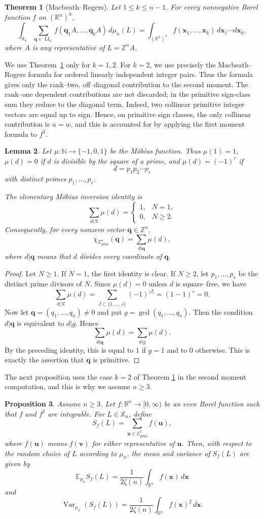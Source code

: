 \documentclass[a4paper,12pt]{article}
\newtheorem{thm}{Theorem}
\newtheorem{lem}[thm]{Lemma}
\newtheorem{prop}[thm]{Proposition}
\theoremstyle{definition}
\theoremstyle{remark}
\newcommand{\re}{\mathbb R}
\newcommand{\ze}{\mathbb Z}
\newcommand{\ex}{\mathbb E}
\newcommand{\LI}{\operatorname{LI}}
\newcommand{\prim}{\operatorname{prim}}
\newcommand{\Var}{\operatorname{Var}}
\begin{document}
\begin{thm}[Macbeath--Rogers]
\label{thm:macbeath}
Let $1\le k\le n-1$.
For every nonnegative Borel function $f$ on $(\re^n)^k$,
$$
\int_{\mathbb X_n}\sum_{\bm q\in\LI_k}f(\bm q_1A,\ldots,\bm q_kA)\,d\mu_n(L)
=
\int_{(\re^n)^k}f(\bm x_1,\ldots,\bm x_k)\,d\bm x_1\cdots d\bm x_k,
$$
where $A$ is any representative of $L=\ze^nA$.
\end{thm}
%
We use Theorem~\ref{thm:macbeath} only for $k=1,2$.
For $k=2$, we use precisely the Macbeath--Rogers formula for ordered
linearly independent integer pairs.
Thus the formula gives only the rank--two, off--diagonal contribution to the second moment.
The rank--one dependent contributions are not discarded; in the
primitive sign-class sum they reduce to the diagonal term.
Indeed, two collinear primitive integer vectors are equal up to sign.
Hence, on primitive sign classes, the only collinear contribution is
$u=w$, and this is accounted for by applying the first moment formula to $f^2$.
%
\begin{lem}
\label{lem:mobius-primitive}
Let $\mu:\mathbb N\to\{-1,0,1\}$ be the M\"obius function. 
Thus $\mu(1)=1$, $\mu(d)=0$ if $d$ is divisible by the square of a prime, and
$\mu(d)=(-1)^r$ if
$$
d=p_1p_2\cdots p_r
$$
with distinct primes $p_1,\ldots,p_r$.

The elementary M\"obius inversion identity is
$$
\sum_{d|N}\mu(d)=
\begin{cases}
1, & N=1,\\
0, & N\ge2.
\end{cases}
$$
Consequently, for every nonzero vector $\bm q\in\ze^n$,
$$
\chi_{\ze^n_{\prim}}(\bm q)=\sum_{d|\bm q}\mu(d),
$$
where $d|\bm q$ means that $d$ divides every coordinate of $\bm q$.
\end{lem}

\begin{proof}
Let $N\ge1$. If $N=1$, the first identity is clear. If $N\ge2$, let
$p_1,\ldots,p_s$ be the distinct prime divisors of $N$. 
Since $\mu(d)=0$ unless $d$ is square--free, we have
$$
\sum_{d|N}\mu(d)
=
\sum_{J\subset\{1,\ldots,s\}}(-1)^{|J|}
=
(1-1)^s
=
0.
$$
Now let $\bm q=(q_1,\ldots,q_n)\ne0$ and put $g=\gcd(q_1,\ldots,q_n)$. 
Then the condition $d|\bm q$ is equivalent to $d|g$. 
Hence
$$
\sum_{d|\bm q}\mu(d)=\sum_{d|g}\mu(d).
$$
By the preceding identity, this is equal to $1$ if $g=1$ and to $0$ otherwise.
This is exactly the assertion that $\bm q$ is primitive.
\end{proof}
%
The next proposition uses the case $k=2$ of Theorem \ref{thm:macbeath} in the
second moment computation, and this is why we assume $n\ge3$.
%
\begin{prop}
\label{prop:weighted}
Assume $n\ge3$.
Let $f:\re^n\to[0,\infty)$ be an even Borel function such that $f$ and $f^2$ are integrable.
For $L\in\mathbb X_n$, define
$$
S_f(L)=\sum_{\bm u\in L_{\prim}^\sharp} f(\bm u),
$$
where $f(\bm u)$ means $f(\bm v)$ for either representative of $\bm u$.
Then, with respect to the random choice of $L$ according to $\mu_n$, the
mean and variance of $S_f(L)$ are given by 
$$
\ex_{\mu_n}S_f(L)=
\frac{1}{2\zeta(n)}\int_{\re^n}f(\bm x)\,d\bm x
$$
and
$$
\Var_{\mu_n}(S_f(L))=
\frac{1}{2\zeta(n)}\int_{\re^n}f(\bm x)^2\,d\bm x.
$$
\end{prop}
\end{document}
